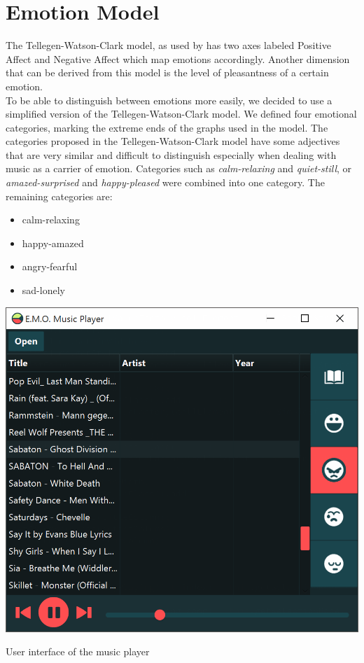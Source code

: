 \documentclass{sigchi-ext}
\begin{document}
\section{Emotion Model}\label{sec:emotion-model}
The Tellegen-Watson-Clark model, as used by \cite{Trohidis2011} has two axes labeled Positive Affect and Negative Affect which map emotions accordingly. Another dimension that can be derived from this model is the level of pleasantness of a certain emotion.\\
To be able to distinguish between emotions more easily, we decided to use a simplified version of the Tellegen-Watson-Clark model. We defined four emotional categories, marking the extreme ends of the graphs used in the model. The categories proposed in the Tellegen-Watson-Clark model have some adjectives that are very similar and difficult to distinguish especially when dealing with music as a carrier of emotion. Categories such as \textit{calm-relaxing} and \textit{quiet-still}, or \textit{amazed-surprised} and \textit{happy-pleased} were combined into one category. The remaining categories are:

\begin{itemize}
	\item calm-relaxing
	\item happy-amazed
	\item angry-fearful
	\item sad-lonely
\end{itemize}

\begin{marginfigure}[0pc]
  \begin{minipage}{\marginparwidth}
    \centering
    \includegraphics[width=1.0\marginparwidth]{images/screenshot.png}
  	\caption{User interface of the music player}~\label{fig:screenshot}
  \end{minipage}
\end{marginfigure}
\end{document}
